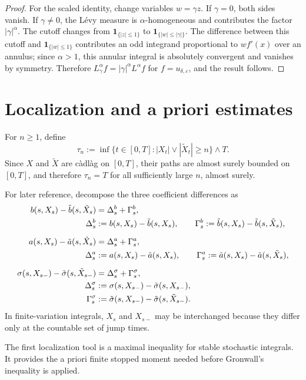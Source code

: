 \documentclass[11pt]{article}
\newcommand{\1}{\mathbf{1}}
\newcommand{\wt}{\tilde}
\newcommand{\eps}{\varepsilon}
\begin{document}
\begin{proof}
For the scaled identity, change variables $w=\gamma z$. If $\gamma=0$, both sides vanish. If $\gamma\ne0$, the L\'evy measure is $\alpha$-homogeneous and contributes the factor $|\gamma|^\alpha$. The cutoff changes from $\1_{\{|z|\le1\}}$ to $\1_{\{|w|\le |\gamma|\}}$. The difference between this cutoff and $\1_{\{|w|\le1\}}$ contributes an odd integrand proportional to $w f'(x)$ over an annulus; since $\alpha>1$, this annular integral is absolutely convergent and vanishes by symmetry. Therefore $L^\alpha_\gamma f=|\gamma|^\alpha L^\alpha f$ for $f=u_{\delta,\eps}$, and the result follows.
\end{proof}


\section{Localization and a priori estimates}
\label{sec:localization}

For $n\ge1$, define
\[
  \tau_n:=\inf\{t\in[0,T]: |X_t|\vee |\wt X_t|\ge n\}\wedge T.
\]
Since $X$ and $\wt X$ are c\`adl\`ag on $[0,T]$, their paths are almost surely bounded on $[0,T]$, and therefore $\tau_n=T$ for all sufficiently large $n$, almost surely.

For later reference, decompose the three coefficient differences as
\begin{align}
b(s,X_s)-\wt b(s,\wt X_s)&=\Delta_s^b+\Gamma_s^b,
\label{eq:drift-coefficient-difference}\\
\Delta_s^b&:=b(s,X_s)-\wt b(s,X_s),\qquad
\Gamma_s^b:=\wt b(s,X_s)-\wt b(s,\wt X_s), \notag\\[2mm]
a(s,X_s)-\wt a(s,\wt X_s)&=\Delta_s^a+\Gamma_s^a,
\label{eq:diffusion-coefficient-difference}\\
\Delta_s^a&:=a(s,X_s)-\wt a(s,X_s),\qquad
\Gamma_s^a:=\wt a(s,X_s)-\wt a(s,\wt X_s), \notag\\[2mm]
\sigma(s,X_{s-})-\wt\sigma(s,\wt X_{s-})&=\Delta_s^\sigma+\Gamma_s^\sigma,
\label{eq:jump-coefficient-difference}\\
\Delta_s^\sigma&:=\sigma(s,X_{s-})-\wt\sigma(s,X_{s-}), \notag\\
\Gamma_s^\sigma&:=\wt\sigma(s,X_{s-})-\wt\sigma(s,\wt X_{s-}). \notag
\end{align}
In finite-variation integrals, $X_s$ and $X_{s-}$ may be interchanged because they differ only at the countable set of jump times.

The first localization tool is a maximal inequality for stable stochastic integrals. It provides the a priori finite stopped moment needed before Gronwall's inequality is applied.
\end{document}

